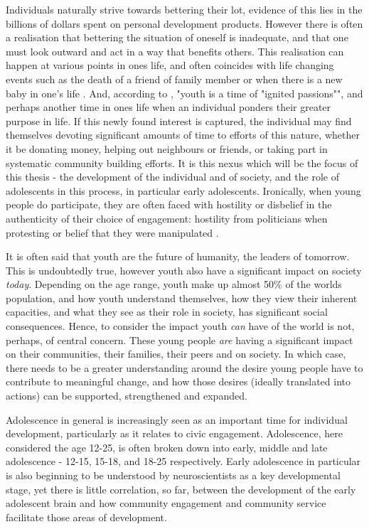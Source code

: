 Individuals naturally strive towards bettering their lot, evidence of this lies in the billions of dollars spent on personal development products. However there is often a realisation that bettering the situation of oneself is inadequate, and that one must look outward and act in a way that benefits others. This realisation can happen at various points in ones life, and often coincides with life changing events such as the death of a friend of family member or when there is a new baby in one's life \citep{Perry2008}. And, according to \citep[][p30]{Damon2009}, "youth is a time of "ignited passions"", and perhaps another time in ones life when an individual ponders their greater purpose in life. 
If this newly found interest is captured, the individual may find themselves devoting significant amounts of time to efforts of this nature, whether it be donating money, helping out neighbours or friends, or taking part in systematic community building efforts. It is this nexus which will be the focus of this thesis - the development of the individual and of society, and the role of adolescents in this process, in particular early adolescents. Ironically, when young people do participate, they are often faced with hostility or disbelief in the authenticity of their choice of engagement: hostility from politicians when protesting or belief that they were manipulated \citep[][p110]{White2008}. 

It is often said that youth are the future of humanity, the leaders of tomorrow. This is undoubtedly true, however youth also have a significant impact on society \textit{today}. Depending on the age range, youth make up almost 50\% of the worlds population, and how youth understand themselves, how they view their inherent capacities, and what they see as their role in society, has significant social consequences. Hence, to consider the impact youth \textit{can} have of the world is not, perhaps, of central concern. These young people \textit{are} having a significant impact on their communities, their families, their peers and on society. In which case, there needs to be a greater understanding around the desire young people have to contribute to meaningful change, and how those desires (ideally translated into actions) can be supported, strengthened and expanded. 

Adolescence in general is increasingly seen as an important time for individual development, particularly as it relates to civic engagement. Adolescence, here considered the age 12-25, is often broken down into early, middle and late adolescence - 12-15, 15-18, and 18-25 respectively. Early adolescence in particular is also beginning to be understood by neuroscientists as a key developmental stage, yet there is little correlation, so far, between the development of the early adolescent brain and how community engagement and community service facilitate those areas of development. 

